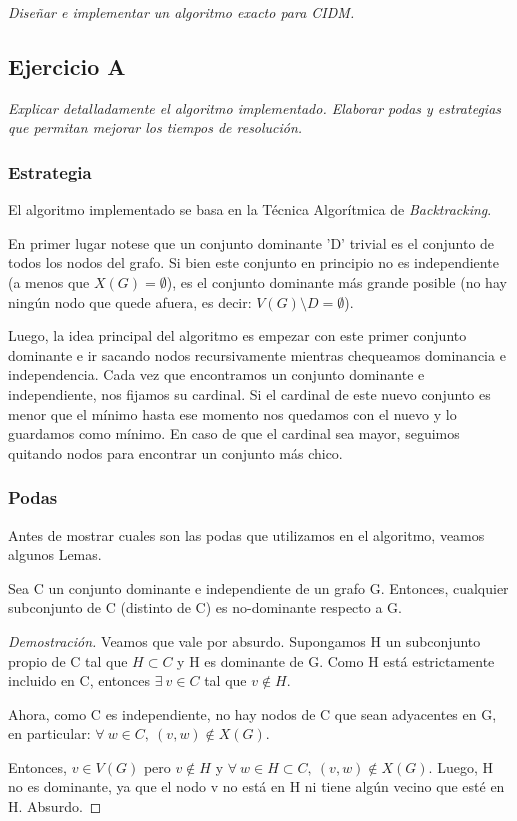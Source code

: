 \textit{Diseñar e implementar un algoritmo exacto para CIDM.}

\subsection{Ejercicio A}

\textit{Explicar detalladamente el algoritmo implementado. Elaborar podas y estrategias que permitan mejorar los tiempos de resolución.}

\medskip

\subsubsection{Estrategia}
El algoritmo implementado se basa en la Técnica Algorítmica de \textit{Backtracking}.

En primer lugar notese que un conjunto dominante 'D' trivial es el conjunto de todos los nodos del grafo. Si bien este conjunto en principio no es independiente (a menos que $X(G) = \emptyset$), es el conjunto dominante más grande posible (no hay ningún nodo que quede afuera, es decir: $V(G) \setminus D = \emptyset$).

Luego, la idea principal del algoritmo es empezar con este primer conjunto dominante e ir sacando nodos recursivamente mientras chequeamos dominancia e independencia. Cada vez que encontramos un conjunto dominante e independiente, nos fijamos su cardinal. Si el cardinal de este nuevo conjunto es menor que el mínimo hasta ese momento nos quedamos con el nuevo y lo guardamos como mínimo. En caso de que el cardinal sea mayor, seguimos quitando nodos para encontrar un conjunto más chico.

\subsubsection{Podas}

Antes de mostrar cuales son las podas que utilizamos en el algoritmo, veamos algunos Lemas.

    \begin{lemma}
        Sea C un conjunto dominante e independiente de un grafo G. Entonces, cualquier subconjunto de C (distinto de C) es no-dominante respecto a G.
    \end{lemma}
    \begin{proof}[Demostración]
        Veamos que vale por absurdo. Supongamos H un subconjunto propio de C tal que $H \subset C$ y H es dominante de G. Como H está estrictamente incluido en C, entonces $\exists\ v \in C$ tal que $v \notin H$.

        Ahora, como C es independiente, no hay nodos de C que sean adyacentes en G, en particular: $\forall\ w \in C,\ (v,w) \notin X(G)$.

        Entonces, $v \in V(G)$ pero $v \notin H$ y $\forall\ w \in H \subset C,\ (v,w) \notin X(G)$. Luego, H no es dominante, ya que el nodo v no está en H ni tiene algún vecino que esté en H. Absurdo.
    \end{proof}

